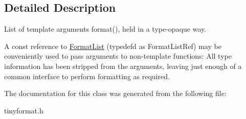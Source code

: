 \subsection{Detailed Description}
List of template arguments format(), held in a type-\/opaque way.

A const reference to \mbox{\hyperlink{classtinyformat_1_1FormatList}{Format\+List}} (typedef\textquotesingle{}d as Format\+List\+Ref) may be conveniently used to pass arguments to non-\/template functions\+: All type information has been stripped from the arguments, leaving just enough of a common interface to perform formatting as required. 

The documentation for this class was generated from the following file\+:\begin{DoxyCompactItemize}
\item 
tinyformat.\+h\end{DoxyCompactItemize}
